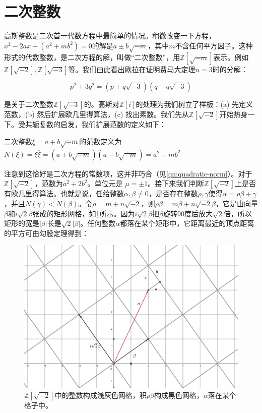 \documentclass[b5paper]{ctexart}
\begin{document}
\section{二次整数}

高斯整数是二次首一代数方程中最简单的情况。稍微改变一下方程，$x^2 - 2ax + (a^2 + mb^2) = 0$的解是$a \pm b\sqrt{-m}$，其中$m$不含任何平方因子。这种形式的代数整数，是二次方程的解，叫做“二次整数”，用$\mathbb{Z}[\sqrt{-m}]$表示。例如$\mathbb{Z}[\sqrt{-2}], \mathbb{Z}[\sqrt{-3}]$等。我们由此看出欧拉在证明费马大定理$n=3$时的分解：

\[
p^2 + 3q^2 = (p + q\sqrt{-3})(q - q\sqrt{-3})
\]

是关于二次整数$\mathbb{Z}[\sqrt{-3}]$的。高斯对$\mathbb{Z}[i]$的处理为我们树立了样板：(a) 先定义范数，(b) 然后扩展欧几里得算法，(c) 找出素数。我们先从$\mathbb{Z}[\sqrt{-2}]$开始热身一下。受共轭复数的启发，我们扩展范数的定义如下：

\begin{definition}
二次整数$\xi = a + b\sqrt{-m}$的范数定义为$N(\xi) = \xi\overline{\xi} = (a + b\sqrt{-m})(a - b\sqrt{-m}) = a^2 + mb^2$
\end{definition}

注意到这恰好是二次方程的常数项，这并非巧合（见\cref{qn:quadratic-norm}）。对于$\mathbb{Z}[\sqrt{-2}]$，范数为$a^2 + 2b^2$。单位元是
$\mu = \pm 1$。接下来我们判断$\mathbb{Z}[\sqrt{-2}]$上是否有欧几里得算法。也就是说，任给整数$\alpha, \beta \ne 0$，是否存在整数$\rho, \gamma$使得$\alpha = \rho \beta + \gamma$，并且$N(\gamma) < N(\beta)$。令$\rho = m + n\sqrt{-2}$，则$\rho \beta = m\beta + n\sqrt{-2}\beta$，它是由向量$\beta$和$i\sqrt{2}\beta$张成的矩形网格，如\cref{fig:Z-sqrt-2}所示。因为$i\sqrt{2}\beta$把$\beta$旋转90度后放大$\sqrt{2}$倍，所以矩形的宽是$|\beta|$长是$\sqrt{2}|\beta|$。任何整数$\alpha$都落在某个矩形中，它距离最近的顶点距离的平方可由勾股定理得到：

\begin{figure}[htbp]
 \centering
 \includegraphics[scale=0.3]{img/z-sqrt-2}
 \caption{$\mathbb{Z}[\sqrt{-2}]$中的整数构成浅灰色网格，积$\rho \beta$构成黑色网格，$\alpha$落在某个格子中。}
 \label{fig:Z-sqrt-2}
\end{figure}
\end{document}
